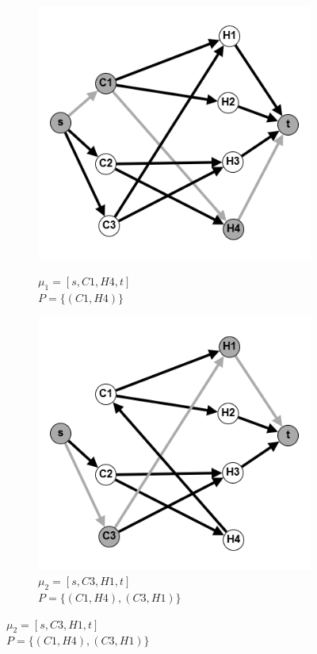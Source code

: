 \documentclass{article}
\begin{document}
\begin{enumerate}
\begin{figure}
\begin{subfigure}[b]{0.35\textwidth}
        \centering
         \caption*{$\mu_1 = [s, C1, H4, t]$\\$P =\{(C1, H4)\}$}
        \includegraphics[width=\textwidth]{attachments/12/1.png}
         \label{fig:12_1}
     \end{subfigure}
     \hfill
     \begin{subfigure}[b]{0.35\textwidth}
        \centering
         \caption*{$\mu_2 = [s, C3, H1, t]$\\$P =\{(C1, H4), (C3, H1)\}$}
        \includegraphics[width=\textwidth]{attachments/12/2.png}

\end{subfigure}
\end{figure}
\end{enumerate}
\end{document}
